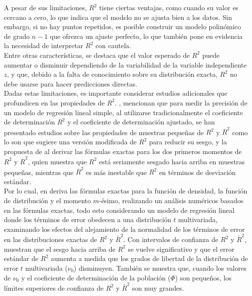 A pesar de sus limitaciones,  $R^{2}$ tiene ciertas ventajas, como cuando su valor es cercano a cero, lo que indica que el modelo no se ajusta bien a los datos. Sin embargo, si no hay puntos repetidos, es posible construir un modelo polinómico de grado $n-1$ que ofrezca un ajuste perfecto, lo que también pone en evidencia la necesidad de interpretar  $R^{2}$ con cautela.\\

Entre otras características, se destaca que el valor esperado de  $R^{2}$ puede aumentar o disminuir dependiendo de la variabilidad de la variable independiente $z$, y que, debido a la falta de conocimiento sobre su distribución exacta,  $R^{2}$  no debe usarse para hacer predicciones directas.\\


Dadas estas limitaciones, es importante considerar estudios adicionales que profundicen en las propiedades de $R^{2}$. \textcite{Ohtani-2004}, mencionan que para medir la precisión de un modelo de regresión lineal simple, al utilizarse tradicionalmente el coeficiente de determinación  \( R^2 \) y el coeficiente de determinación ajustado, se han presentado estudios sobre las propiedades de muestras pequeñas de \( R^2 \) y \( \overline{R}^2 \) como lo son \textcite{barten-1962} que sugiere una versión modificada de \( R^2 \) para reducir su sesgo, y la propuesta de \textcite{crammer-1987} al derivar las fórmulas exactas para los dos primeros momentos de \( R^2 \) y \( \overline{R}^2 \), quien muestra que \( R^2 \) está seriamente sesgado hacia arriba en muestras pequeñas, mientras que \( \overline{R}^2 \) es más inestable que \( R^2 \) en términos de desviación estándar.\\


Por lo cual, en \textcite{Ohtani-2004} deriva las fórmulas exactas para la función de densidad, la función de distribución y el momento \(m\)-ésimo, realizando un análisis numéricos basados en las fórmulas exactas, todo esto considerando un modelo de regresión lineal donde los términos de error obedecen a una distribución \(t\) multivariada, examinando los efectos del alejamiento de la normalidad de los términos de error en las distribuciones exactas de \(R^2\) y \(\bar{R}^2\). Con intervalos de confianza de \(R^2\) y \(\bar{R}^2\), muestran que el sesgo hacia arriba de \(R^2\) se vuelve significativo y que el error estándar de \(R^2\) aumenta a medida que los grados de libertad de la distribución de error \(t\) multivariada (\(\nu_0\)) disminuyen. También se muestra que, cuando los valores de \(\nu_0\) y el coeficiente de determinación de la población (\(\Phi\)) son pequeños, los límites superiores de confianza de \(R^2\) y \(\bar{R}^2\) son muy grandes.\\

